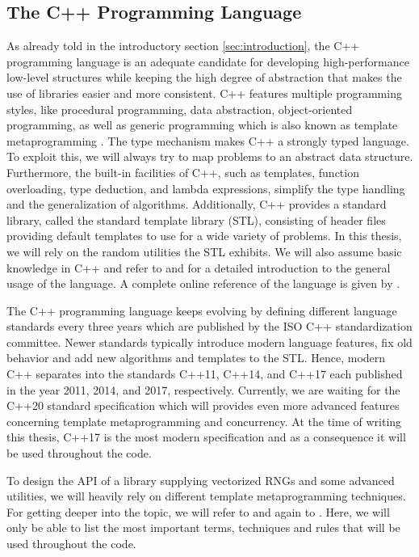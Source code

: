 \documentclass{stdlocal}
\begin{document}
  \subsection{The C++ Programming Language} %
  \label{sub:the_c_programming_language}
    As already told in the introductory section \ref{sec:introduction}, the C++ programming language is an adequate candidate for developing high-performance low-level structures while keeping the high degree of abstraction that makes the use of libraries easier and more consistent.
    C++ features multiple programming styles, like procedural programming, data abstraction, object-oriented programming, as well as generic programming which is also known as template metaprogramming \autocite{stroustrup2014,vandevoorde2018}.
    The type mechanism makes C++ a strongly typed language.
    To exploit this, we will always try to map problems to an abstract data structure.
    Furthermore, the built-in facilities of C++, such as templates, function overloading, type deduction, and lambda expressions, simplify the type handling and the generalization of algorithms.
    Additionally, C++ provides a standard library, called the standard template library (STL), consisting of header files providing default templates to use for a wide variety of problems.
    In this thesis, we will rely on the random utilities the STL exhibits.
    We will also assume basic knowledge in C++ and refer to \textcite{stroustrup2014} and \textcite{meyers2014} for a detailed introduction to the general usage of the language.
    A complete online reference of the language is given by \textcite{cppreference}.

    The C++ programming language keeps evolving by defining different language standards every three years which are published by the ISO C++ standardization committee.
    Newer standards typically introduce modern language features, fix old behavior and add new algorithms and templates to the STL.
    Hence, modern C++ separates into the standards C++11, C++14, and C++17 each published in the year 2011, 2014, and 2017, respectively.
    Currently, we are waiting for the C++20 standard specification which will provides even more advanced features concerning template metaprogramming and concurrency.
    At the time of writing this thesis, C++17 is the most modern specification and as a consequence it will be used throughout the code.
    \autocite{stroustrup2014,meyers2014,vandevoorde2018}

    To design the API of a library supplying vectorized RNGs and some advanced utilities, we will heavily rely on different template metaprogramming techniques.
    For getting deeper into the topic, we will refer to \textcite{vandevoorde2018} and again to \textcite{meyers2014}.
    Here, we will only be able to list the most important terms, techniques and rules that will be used throughout the code.
\end{document}
